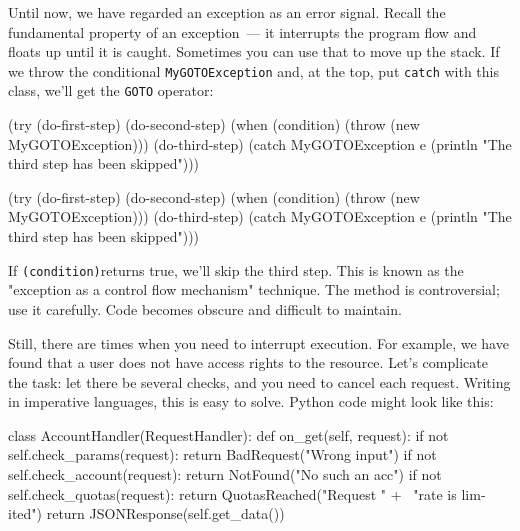 
Until now, we have regarded an exception as an error signal. Recall the fundamental property of an exception~--- it interrupts the program flow and floats up until it is caught. Sometimes you can use that to move up the stack. If we throw the conditional \verb|MyGOTOException| and, at the top, put \verb|catch| with this class, we'll get the \verb|GOTO| operator: 

\ifx\DEVICETYPE\MOBILE

\begin{english}
  \begin{clojure}
(try
  (do-first-step)
  (do-second-step)
  (when (condition)
    (throw (new MyGOTOException)))
  (do-third-step)
  (catch MyGOTOException e
    (println "The third step
                  has been skipped")))
  \end{clojure}
\end{english}

\else

\begin{english}
  \begin{clojure}
(try
  (do-first-step)
  (do-second-step)
  (when (condition)
    (throw (new MyGOTOException)))
  (do-third-step)
  (catch MyGOTOException e
    (println "The third step has been skipped")))
  \end{clojure}
\end{english}

\fi

If \verb|(condition)|returns true, we'll skip the third step. This is known as the "exception as a control flow mechanism" technique. The method is controversial; use it carefully. Code becomes obscure and difficult to maintain.


Still, there are times when you need to interrupt execution. For example, we have found that a user does not have access rights to the resource. Let's complicate the task: let there be several checks, and you need to cancel each request.
Writing in imperative languages, this is easy to solve. Python code might look like this:


\ifx\DEVICETYPE\MOBILE

\begin{english}
  \begin{python}
class AccountHandler(RequestHandler):
  def on_get(self, request):
    if not self.check_params(request):
      return BadRequest("Wrong input")
    if not self.check_account(request):
      return NotFound("No such an acc")
    if not self.check_quotas(request):
      return QuotasReached("Request " + \
             "rate is limited")
    return JSONResponse(self.get_data())
  \end{python}
\end{english}

